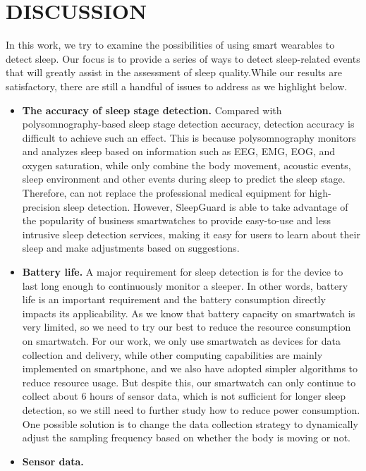\section{DISCUSSION}\label{sec:discussion}
In this work, we try to examine the possibilities of using smart wearables to detect sleep. Our focus is to provide a series of ways to detect sleep-related events that will greatly assist in the assessment of sleep quality.While our results are satisfactory, there are still a handful of issues to address as we highlight below.

\begin{itemize}
  \item \textbf{The accuracy of sleep stage detection.}
  Compared with polysomnography-based sleep stage detection accuracy, {\systemname} detection accuracy is difficult to achieve such an effect. This is because polysomnography monitors and analyzes sleep based on information such as EEG, EMG, EOG, and oxygen saturation, while {\systemname} only combine the body movement, acoustic events, sleep environment and other events during sleep to predict the sleep stage. Therefore, {\systemname} can not replace the professional medical equipment for high-precision sleep detection. However, SleepGuard is able to take advantage of the popularity of business smartwatches to provide easy-to-use and less intrusive sleep detection services, making it easy for users to learn about their sleep and make adjustments based on suggestions.
  \item \textbf{Battery life.}
  A major requirement for sleep detection is for the device to last long enough to continuously monitor a sleeper. In other words, battery life is an important requirement and the battery consumption directly impacts its applicability. As we know that battery capacity on smartwatch is very limited, so we need to try our best to reduce the resource consumption on smartwatch. For our work, we only use smartwatch as devices for data collection and delivery, while other computing capabilities are mainly implemented on smartphone, and we also have adopted simpler algorithms to reduce resource usage. But despite this, our smartwatch can only continue to collect about 6 hours of sensor data, which is not sufficient for longer sleep detection, so we still need to further study how to reduce power consumption. One possible solution is to change the data collection strategy to dynamically adjust the sampling frequency based on whether the body is moving or not.
  \item \textbf{Sensor data.}

\end{itemize}
